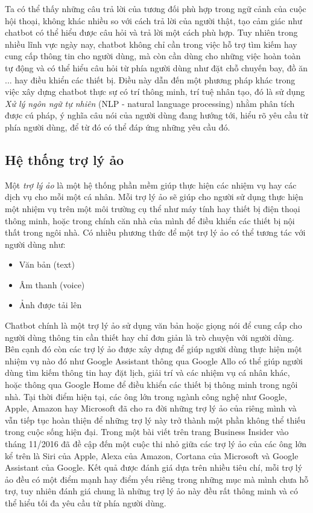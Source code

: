 \documentclass[12pt]{report}
\begin{document}
Ta có thể thấy những câu trả lời của \alice{} tương đối phù hợp trong ngữ cảnh của cuộc hội thoại, không khác nhiều so với cách trả lời của người thật, tạo cảm giác như chatbot có thể hiểu được câu hỏi và trả lời một cách phù hợp. Tuy nhiên trong nhiều lĩnh vực ngày nay, chatbot không chỉ cần trong việc hỗ trợ tìm kiếm hay cung cấp thông tin cho người dùng, mà còn cần dùng cho những việc hoàn toàn tự động và có thể hiểu câu hỏi từ phía người dùng như đặt chỗ chuyến bay, đồ ăn ... hay điều khiển các thiết bị. Điều này dẫn đến một phương pháp khác trong việc xây dựng chatbot thực sự có trí thông minh, trí tuệ nhân tạo, đó là sử dụng \textit{Xử lý ngôn ngữ tự nhiên} (NLP - natural language processing) nhằm phân tích được cú pháp, ý nghĩa câu nói của người dùng đang hướng tới, hiểu rõ yêu cầu từ phía người dùng, để từ đó có thể đáp ứng những yêu cầu đó.

\subsection{Hệ thống trợ lý ảo}
Một \textit{trợ lý ảo} là một hệ thống phần mềm giúp thực hiện các nhiệm vụ hay các dịch vụ cho mỗi một cá nhân. Mỗi trợ lý ảo sẽ giúp cho người sử dụng thực hiện một nhiệm vụ trên một môi trường cụ thể như máy tính hay thiết bị điện thoại thông minh, hoặc trong chính căn nhà của mình để điều khiển các thiết bị nội thất trong ngôi nhà. Có nhiều phương thức để một trợ lý ảo có thể tương tác với người dùng như:

\begin{itemize}
	\item Văn bản (text)
	\item Âm thanh (voice)
	\item Ảnh được tải lên
\end{itemize}

Chatbot chính là một trợ lý ảo sử dụng văn bản hoặc giọng nói để cung cấp cho người dùng thông tin cần thiết hay chỉ đơn giản là trò chuyện với người dùng. Bên cạnh đó còn các trợ lý ảo được xây dựng để giúp người dùng thực hiện một nhiệm vụ nào đó như Google Assistant thông qua Google Allo có thể giúp người dùng tìm kiếm thông tin hay đặt lịch, giải trí và các nhiệm vụ cá nhân khác, hoặc thông qua Google Home để điều khiển các thiết bị thông minh trong ngôi nhà. Tại thời điểm hiện tại, các ông lớn trong ngành công nghệ như Google, Apple, Amazon hay Microsoft đã cho ra đời những trợ lý ảo của riêng mình và vẫn tiếp tục hoàn thiện để những trợ lý này trở thành một phần không thể thiếu trong cuộc sống hiện đại. Trong một bài viết trên trang Business Insider vào tháng 11/2016 đã đề cập đến một cuộc thi nhỏ giữa các trợ lý ảo của các ông lớn kể trên là Siri của Apple, Alexa của Amazon, Cortana của Microsoft và Google Assistant của Google\cite{va-compare}. Kết quả được đánh giá dựa trên nhiều tiêu chí, mỗi trợ lý ảo đều có một điểm mạnh hay điểm yếu riêng trong những mục mà mình chưa hỗ trợ, tuy nhiên đánh giá chung là những trợ lý ảo này đều rất thông minh và có thể hiểu tối đa yêu cầu từ phía người dùng. 
\end{document}
